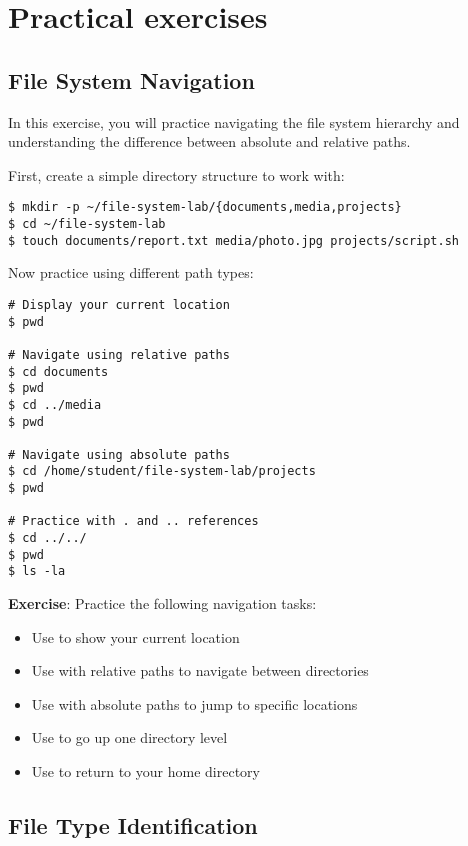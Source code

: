 \newpage

\section{Practical exercises}

\subsection{File System Navigation}

In this exercise, you will practice navigating the file system hierarchy and understanding the difference between absolute and relative paths.

First, create a simple directory structure to work with:

\begin{lstlisting}[style=bashstyle]
$ mkdir -p ~/file-system-lab/{documents,media,projects}
$ cd ~/file-system-lab
$ touch documents/report.txt media/photo.jpg projects/script.sh
\end{lstlisting}

Now practice using different path types:

\begin{lstlisting}[style=bashstyle]
# Display your current location
$ pwd

# Navigate using relative paths
$ cd documents
$ pwd
$ cd ../media
$ pwd

# Navigate using absolute paths
$ cd /home/student/file-system-lab/projects
$ pwd

# Practice with . and .. references
$ cd ../../
$ pwd
$ ls -la
\end{lstlisting}

\textbf{Exercise}: Practice the following navigation tasks:
\begin{itemize}
    \item Use  to show your current location
    \item Use  with relative paths to navigate between directories
    \item Use  with absolute paths to jump to specific locations
    \item Use  to go up one directory level
    \item Use  to return to your home directory
\end{itemize}

\subsection{File Type Identification}

